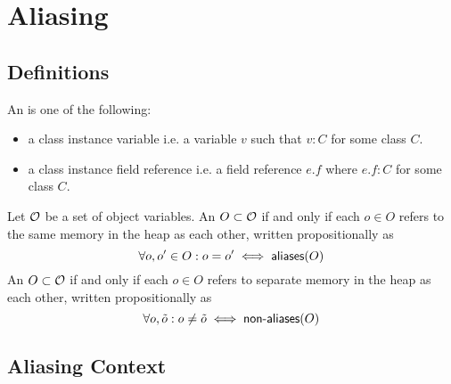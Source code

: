 \section{Aliasing}

\subsection{Definitions}

An  is one of the following:
\begin{itemize}
  \item a class instance variable i.e. a variable $v$ such that $v : C$ for some class $C$.
  \item a class instance field reference i.e. a field reference $e.f$ where $e.f : C$ for some class $C$.
\end{itemize}
Let $\mathcal{O}$ be a set of object variables.
An $O \subset \mathcal{O}$  if and only if
each $o \in O$ refers to the same memory in the heap as each other,
written propositionally as
$$
  \forall o, o^\prime \in O : o = o^\prime \iff \textsf{aliases}(O)
$$
An $O \subset \mathcal{O}$  if and only if
each $o \in O$ refers to separate memory in the heap as each other,
written propositionally as
$$
  \forall o, \tilde o : o \neq \tilde o \iff \textsf{non-aliases}(O)
$$

\subsection{Aliasing Context}

